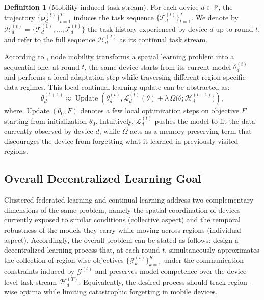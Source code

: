 \documentclass[conference]{IEEEtran}
\theoremstyle{plain}
\theoremstyle{definition}
\newtheorem{definition}{Definition}
\begin{document}
\begin{definition}[Mobility-induced task stream]\label{def:task-stream}
For each device $d \in \mathcal{V}$, the trajectory $\{\mathbf{p}_d^{(t)}\}_{t=1}^T$ induces the task sequence $\{\mathcal{T}_d^{(t)}\}_{t=1}^T$.
We denote by $\mathcal{H}_d^{(t)} = \{\mathcal{T}_d^{(1)}, \dots, \mathcal{T}_d^{(t)}\}$ the task history experienced by device $d$ up to round $t$, and refer to the full sequence $\mathcal{H}_d^{(T)}$ as its continual task stream.
\end{definition}

According to , 
 node mobility transforms a spatial learning problem into a sequential one:
 at round $t$, 
 the same device starts from its current model $\theta_d^{(t)}$ and performs a local adaptation step while traversing different region-specific data regimes.
This local continual-learning update can be abstracted as:
\[
    \theta_d^{(t+1)}
    \approx
    \operatorname{Update}\!\left(
        \theta_d^{(t)},
        \mathcal{L}_d^{(t)}(\theta) + \lambda \,\Omega\bigl(\theta;\mathcal{H}_d^{(t-1)}\bigr)
    \right),
\]
where $\operatorname{Update}(\theta_0,F)$ denotes a few local optimization steps on objective $F$ starting from initialization $\theta_0$. 
Intuitively, $\mathcal{L}_d^{(t)}$ pushes the model to fit the data currently observed by device $d$, 
while $\Omega$ acts as a memory-preserving term that discourages the device from forgetting what it learned in previously visited regions.

\subsection{Overall Decentralized Learning Goal}
Clustered federated learning and continual learning address two complementary dimensions of the same problem, 
namely the spatial coordination of devices currently exposed to similar conditions (collective aspect) 
and the temporal robustness of the models they carry while moving across regions (individual aspect). 
Accordingly, 
the overall problem can be stated as follows: 
design a decentralized learning process that, at each round $t$, 
simultaneously approximates the collection of region-wise objectives $\{\mathcal{J}_k^{(t)}\}_{k=1}^K$ under the communication constraints induced by $\mathcal{G}^{(t)}$ 
and preserves model competence over the device-level task stream $\mathcal{H}_d^{(T)}$. 
Equivalently, 
the desired process should track region-wise optima while limiting catastrophic forgetting in mobile devices.
\end{document}
